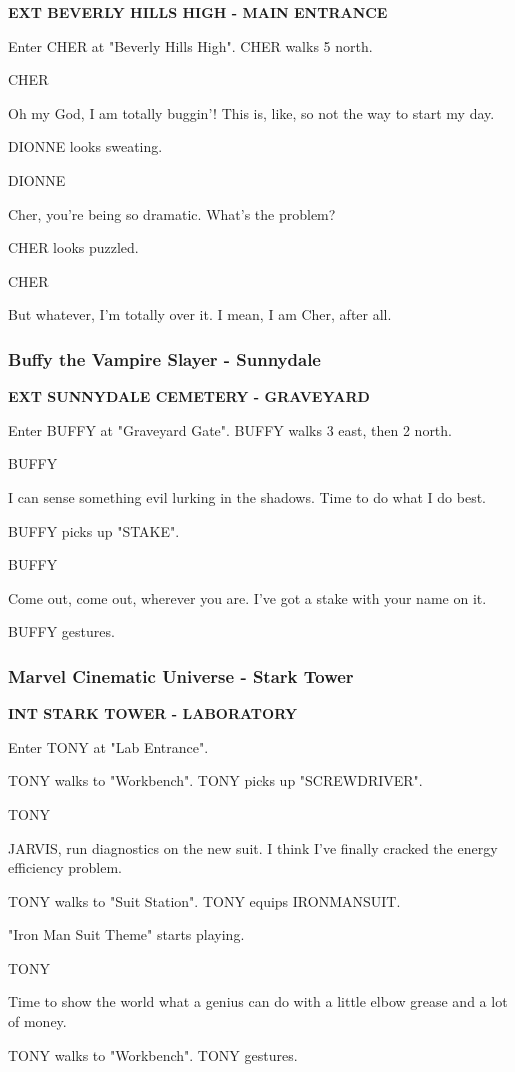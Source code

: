 \documentclass[11pt,letterpaper,oldstylefigures]{memoir}
\newcommand{\slugline}[1]{\nobreak\textbf{\MakeUppercase{#1}}\par\nobreak\vspace{1\baselineskip}}
\newcommand{\speaker}[1]{\nobreak\hspace*{0.333\textwidth}\MakeUppercase{#1}\par\nobreak\vspace{0.5\baselineskip}}
\newcommand{\dialogue}[1]{\nobreak\hspace*{0.25\textwidth}\begin{minipage}{0.5\textwidth}#1\end{minipage}\par\vspace{1\baselineskip}}
\newcommand{\stagedir}[1]{#1\par\vspace{1\baselineskip}}
\newenvironment{FountainExample}
  {\begingroup
  \ttfamily\small
   \setlength{\parindent}{0pt}
  \setlength{\parskip}{0.5em}
  \allowdisplaybreaks
  \setlength{\displaywidowpenalty}{0}
  \setlength{\widowpenalty}{0}
  \setlength{\clubpenalty}{0}
  \setlength{\interlinepenalty}{0}
}
  {\endgroup}
\newcommand{\paragraphbreak}{\vspace{0.5em}}
\begin{document}
\begin{FountainExample}
\slugline{EXT BEVERLY HILLS HIGH - MAIN ENTRANCE}

\stagedir{Enter CHER at "Beverly Hills High". CHER walks 5 north.}

\speaker{CHER}
\dialogue{Oh my God, I am totally buggin'! This is, like, so not the way to start my day.}

\stagedir{DIONNE looks sweating.}

\speaker{DIONNE}
\dialogue{Cher, you're being so dramatic. What's the problem?}

\stagedir{CHER looks puzzled.}

\speaker{CHER}
\dialogue{But whatever, I'm totally over it. I mean, I am Cher, after all.}
\end{FountainExample}

\paragraphbreak

\subsubsection*{Buffy the Vampire Slayer - Sunnydale}
\label{ex:buffy-the-vampire-slayer-sunnydale}

\begin{FountainExample}
\slugline{EXT SUNNYDALE CEMETERY - GRAVEYARD}

\stagedir{Enter BUFFY at "Graveyard Gate". BUFFY walks 3 east, then 2 north.}

\speaker{BUFFY}
\dialogue{I can sense something evil lurking in the shadows. Time to do what I do best.}

\stagedir{BUFFY picks up "STAKE".}

\speaker{BUFFY}
\dialogue{Come out, come out, wherever you are. I've got a stake with your name on it.}

\stagedir{BUFFY gestures.}
\end{FountainExample}

\paragraphbreak
\subsubsection*{Marvel Cinematic Universe - Stark Tower}
\label{ex:marvel-cinematic-universe-stark-tower}

\begin{FountainExample}
\slugline{INT STARK TOWER - LABORATORY}
\stagedir{Enter TONY at "Lab Entrance".}

\stagedir{TONY walks to "Workbench". TONY picks up "SCREWDRIVER".}

\speaker{TONY}
\dialogue{JARVIS, run diagnostics on the new suit. I think I've finally cracked the energy efficiency problem.}

\stagedir{TONY walks to "Suit Station". TONY equips IRONMANSUIT.}
\stagedir{"Iron Man Suit Theme" starts playing.}

\speaker{TONY}
\dialogue{Time to show the world what a genius can do with a little elbow grease and a lot of money.}

\stagedir{TONY walks to "Workbench". TONY gestures.}
\end{FountainExample}
\end{document}
